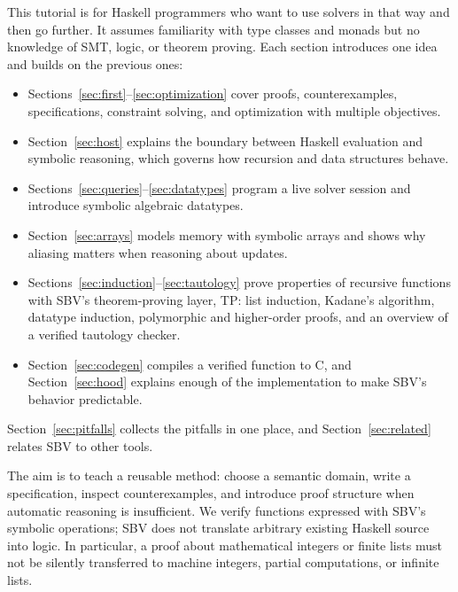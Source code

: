 \documentclass[acmsmall,screen,review,anonymous,nonacm]{acmart}
\begin{document}
This tutorial is for Haskell programmers who want to use solvers in that way and
then go further. It assumes familiarity with type classes and monads but no
knowledge of SMT, logic, or theorem proving. Each section introduces one idea and
builds on the previous ones:
\begin{itemize}
\item Sections~\ref{sec:first}--\ref{sec:optimization} cover proofs, counterexamples,
  specifications, constraint solving, and optimization with multiple objectives.
\item Section~\ref{sec:host} explains the boundary between Haskell evaluation and
  symbolic reasoning, which governs how recursion and data structures behave.
\item Sections~\ref{sec:queries}--\ref{sec:datatypes} program a live solver
  session and introduce symbolic algebraic datatypes.
\item Section~\ref{sec:arrays} models memory with symbolic arrays and shows why
  aliasing matters when reasoning about updates.
\item Sections~\ref{sec:induction}--\ref{sec:tautology} prove properties of
  recursive functions with SBV's theorem-proving layer, TP: list induction,
  Kadane's algorithm, datatype induction, polymorphic and higher-order proofs,
  and an overview of a verified tautology checker.
\item Section~\ref{sec:codegen} compiles a verified function to C, and
  Section~\ref{sec:hood} explains enough of the implementation to make SBV's
  behavior predictable.
\end{itemize}
Section~\ref{sec:pitfalls} collects the pitfalls in one place, and
Section~\ref{sec:related} relates SBV to other tools.

The aim is to teach a reusable method: choose a semantic domain, write a
specification, inspect counterexamples, and introduce proof structure when
automatic reasoning is insufficient. We verify functions expressed with SBV's
symbolic operations; SBV does not translate arbitrary existing Haskell source
into logic. In particular, a proof about mathematical integers or finite lists
must not be silently transferred to machine integers, partial computations, or
infinite lists.
\end{document}
